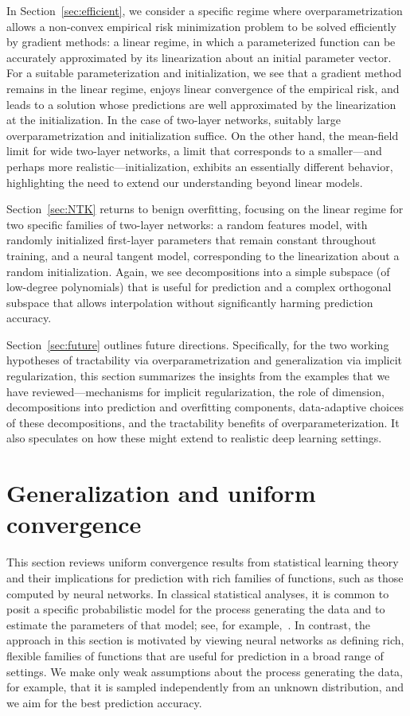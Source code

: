 In Section~\ref{sec:efficient}, we consider a specific regime where overparametrization allows a non-convex empirical risk minimization problem to be solved efficiently by gradient methods: a linear regime, in which a parameterized function can be accurately approximated by its linearization about an initial parameter vector.  For a suitable parameterization and initialization, we see that a gradient method remains in the linear regime, enjoys linear convergence of the empirical risk, and leads to a solution whose predictions are well approximated by the linearization at the initialization. In the case of two-layer networks, suitably large overparametrization and initialization suffice.  On the other hand, the mean-field limit for wide two-layer networks, a limit that corresponds to a smaller---and perhaps more realistic---initialization, exhibits an essentially different behavior, highlighting the need to extend our understanding beyond linear models.

Section~\ref{sec:NTK} returns to benign overfitting, focusing on the linear regime for two specific families of two-layer networks: a random features model, with randomly initialized first-layer parameters that remain constant throughout training, and a neural tangent model, corresponding to the linearization about a random initialization. Again, we see decompositions into a simple subspace (of low-degree polynomials) that is useful for prediction and a complex orthogonal subspace that allows interpolation without significantly harming prediction accuracy.

Section~\ref{sec:future} outlines future directions. Specifically, for the two working hypotheses of tractability via overparametrization and generalization via implicit regularization, this section summarizes the insights from the examples that we have reviewed---mechanisms for implicit regularization, the role of dimension, decompositions into prediction and overfitting components, data-adaptive choices of these decompositions, and the tractability benefits of overparameterization. It also speculates on how these might extend to realistic deep learning settings.

\section{Generalization and uniform convergence}
\label{sec:slt}

This section reviews  uniform convergence results from statistical learning theory and their implications for prediction with rich families of functions, such as those computed by neural networks.  In classical statistical analyses, it is common to posit a specific probabilistic model for the process generating the data and to estimate the parameters of that model; see, for example,~\cite{bd-ms-07}.  In contrast, the approach in this section is motivated by viewing neural networks as defining rich, flexible families of functions that are useful for prediction in a broad range of settings. We make only weak assumptions about the process generating the data, for example, that it is sampled independently from an unknown distribution, and we aim for the best prediction accuracy.

